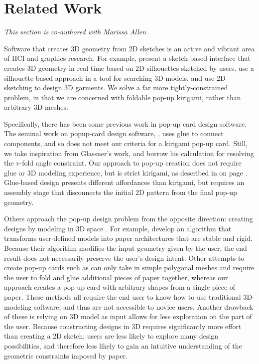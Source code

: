 \section{Related Work}\label{related-work}

\emph{This section is co-authored with Marissa Allen}

Software that creates 3D geometry from 2D sketches is an active and
vibrant area of HCI and graphics research. For example,
\citet{igarashi2007teddy} present a sketch-based interface that creates
3D geometry in real time based on 2D silhouettes sketched by users.
\citet{patrick20022d} use a silhouette-based approach in a tool for
searching 3D models, and \citet{wang2003feature} use 2D sketching to
design 3D garments. We solve a far more tightly-constrained problem, in
that we are concerned with foldable pop-up kirigami, rather than
arbitrary 3D meshes.

Specifically, there has been some previous work in pop-up card design
software. The seminal work on popup-card design software,
\citet{glassner1998interactive}, uses glue to connect components, and so
does not meet our criteria for a kirigami pop-up card. Still, we take
inspiration from Glassner's work, and borrow his calculation for
resolving the v-fold angle constraint. Our approach to pop-up creation
does not require glue or 3D modeling experience, but is strict kirigami,
as described in  on page \pageref{background}.
Glue-based design presents different affordances than kirigami, but
requires an assembly stage that disconnects the initial 2D pattern from
the final pop-up geometry.

Others approach the pop-up design problem from the opposite direction:
creating designs by modeling in 3D space \citet{ruiz2014multi}. For
example, \citet{li2010popup} develop an algorithm that transforms
user-defined models into paper architectures that are stable and rigid.
Because their algorithm modifies the input geometry given by the user,
the end result does not necessarily preserve the user's design intent.
Other attempts to create pop-up cards such as \citet{abel2013algorithms}
can only take in simple polygonal meshes and require the user to fold
and glue additional pieces of paper together, whereas our approach
creates a pop-up card with arbitrary shapes from a single piece of
paper. These methods all require the end user to know how to use
traditional 3D-modeling software, and thus are not accessible to novice
users. Another drawback of these is relying on 3D model as input allows
for less exploration on the part of the user. Because constructing
designs in 3D requires significantly more effort than creating a 2D
sketch, users are less likely to explore many design possibilities, and
therefore less likely to gain an intuitive understanding of the
geometric constraints imposed by paper.


